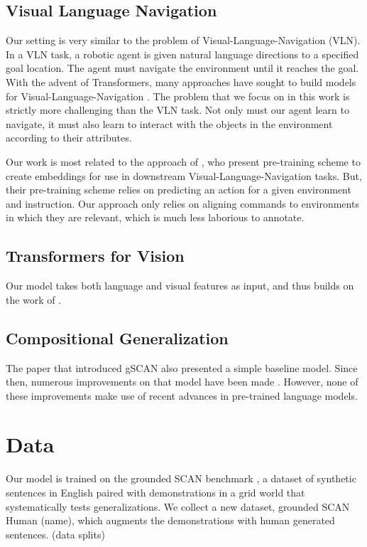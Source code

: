 \documentclass[11pt]{article}
\begin{document}
\subsection{Visual Language Navigation}
Our setting is very similar to the problem of Visual-Language-Navigation (VLN). 
%
In a VLN task, a robotic agent is given natural language directions to a specified goal location. 
%
The agent must navigate the environment until it reaches the goal.
%
With the advent of Transformers, many approaches have sought to build models for Visual-Language-Navigation \citep{magassouba2021crossmap, fang2019scene, Chen2020TopologicalPW}.
%
The problem that we focus on in this work is strictly more challenging than the VLN task. 
%
Not only must our agent learn to navigate, it must also learn to interact with the objects in the environment according to their attributes.

%
Our work is most related to the approach of \citet{Hao2020TowardsLA}, who present pre-training scheme to create embeddings for use in downstream Visual-Language-Navigation tasks.
%
But, their pre-training scheme relies on predicting an action for a given environment and instruction.
%
Our approach only relies on aligning commands to environments in which they are relevant, which is much less laborious to annotate.
%

\subsection{Transformers for Vision}
Our model takes both language and visual features as input, and thus builds on the work of \citep{LuViLBERT2019, tan-bansal-2019-lxmert, LiVisualBert2019}.

\subsection{Compositional Generalization}
The paper \citep{ruis2020benchmark} that introduced gSCAN also presented a simple baseline model.
%
Since then, numerous improvements on that model have been made \citep{gao-etal-2020-systematic, heinze-think-2020, kuo2020compositional}.
%
However, none of these improvements make use of recent advances in pre-trained language models. 

\section{Data}
Our model is trained on the grounded SCAN benchmark \citep{ruis2020benchmark}, a dataset of synthetic sentences in English paired with demonstrations in a grid world that systematically tests generalizations.
%
We collect a new dataset, grounded SCAN Human (\TODO name), which augments the demonstrations with human generated sentences.
%
(\TODO data splits)
\end{document}
